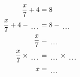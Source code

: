 \documentclass[12pt]{article}
\begin{document}
\begin{multicols}{2}
\begin{minipage}[t]{0.45\textwidth}
    \raggedright %
    \begin{align*} %
        \frac{x}{7} + 4 &= 8\\
        \frac{x}{7} + 4 - \dotuline{\hspace{5mm}} &= 8 - \dotuline{\hspace{5mm}}\\
        \frac{x}{7} &= \dotuline{\hspace{5mm}}\\
        \frac{x}{7} \times\dotuline{\hspace{5mm}} &= \dotuline{\hspace{5mm}} \times\dotuline{\hspace{5mm}}\\
        x &= \dotuline{\hspace{5mm}}\\
    \end{align*}
\end{minipage}\newpage

\end{multicols}
\end{document}
